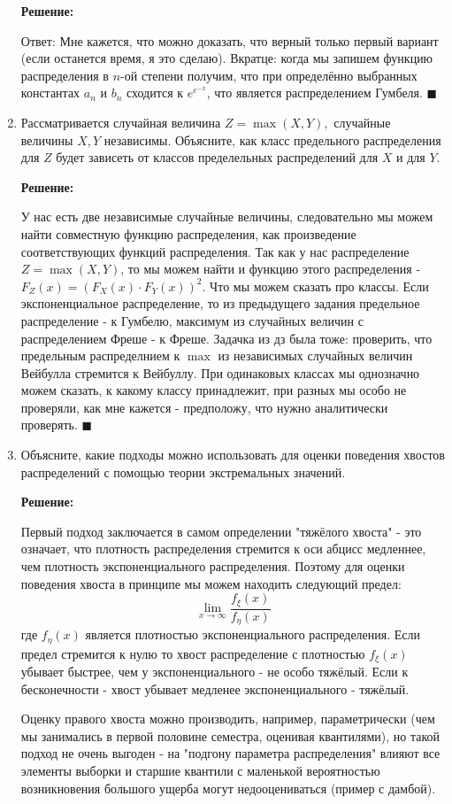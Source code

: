 \documentclass[%
12pt, %
final, %
oneside, %
onecolumn, %
centertags]{article} %
\theoremstyle{plain}
\theoremstyle{definition}
\theoremstyle{remark}
\begin{document}
\begin{enumerate}
\textbf{Решение:}

Ответ: Мне кажется, что можно доказать, что верный только первый вариант (если останется время, я это сделаю). Вкратце: когда мы запишем функцию распределения в $n$-ой степени получим, что при определённо выбранных константах $a_n$ и $b_n$ сходится к $e^{e^{-x}}$, что является распределением Гумбеля. $\blacksquare$

\item Рассматривается случайная величина $Z=\max(X,Y),$ случайные величины $X,Y$ независимы. Объясните, как класс предельного распределения для $Z$ будет зависеть от классов пределельных распределений для $X$ и для $Y.$

\textbf{Решение:}

У нас есть две независимые случайные величины, следовательно мы можем найти совместную функцию распределения, как произведение соответствующих функций распределения. Так как у нас распределение $Z = \max(X, Y)$, то мы можем найти и функцию этого распределения - $F_{Z}(x) = (F_{X}(x) \cdot F_{Y}(x))^2$. Что мы можем сказать про классы. Если экспоненциальное распределение, то из предыдущего задания предельное распределение - к Гумбелю, максимум из случайных величин с распределением Фреше - к Фреше. Задачка из дз была тоже: проверить, что предельным распределнием к $\max$ из независимых случайных величин Вейбулла стремится к Вейбуллу. При одинаковых классах мы однозначно можем сказать, к какому классу принадлежит, при разных мы особо не проверяли, как мне кажется - предположу, что нужно аналитически проверять. $\blacksquare$

\item Объясните, какие подходы можно использовать для оценки поведения хвостов распределений с помощью теории экстремальных значений.

\textbf{Решение:}

Первый подход заключается в самом определении "тяжёлого хвоста" - это означает, что плотность распределения стремится к оси абцисс медленнее, чем плотность экспоненциального распределения. Поэтому для оценки поведения хвоста в принципе мы можем находить следующий предел:
$$\lim\limits_{x \to \infty} \frac{f_{\xi}(x)}{f_{\eta}(x)}$$
где $f_{\eta}(x)$ является плотностью экспоненциального распределения. Если предел стремится к нулю то хвост распределение с плотностью $f_{\xi}(x)$ убывает быстрее, чем у экспоненциального - не особо тяжёлый. Если к бесконечности - хвост убывает медленее экспоненциального - тяжёлый.

Оценку правого хвоста можно производить, например, параметрически (чем мы занимались в первой половине семестра, оценивая квантилями), но такой подход не очень выгоден - на "подгону параметра распределения" влияют все элементы выборки и старшие квантили с маленькой вероятностью возникновения большого ущерба могут недооцениваться (пример с дамбой). 


\end{enumerate}
\end{document}
